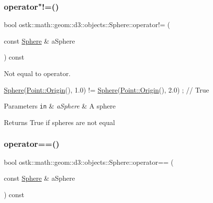 \subsubsection{\texorpdfstring{operator"!=()}{operator!=()}}
{\footnotesize\ttfamily bool ostk\+::math\+::geom\+::d3\+::objects\+::\+Sphere\+::operator!= (\begin{DoxyParamCaption}\item[{const \hyperlink{classostk_1_1math_1_1geom_1_1d3_1_1objects_1_1_sphere}{Sphere} \&}]{a\+Sphere }\end{DoxyParamCaption}) const}



Not equal to operator. 


\begin{DoxyCode}
\hyperlink{classostk_1_1math_1_1geom_1_1d3_1_1objects_1_1_sphere_a6920f72260a7b2c9ffc29283540e16c2}{Sphere}(\hyperlink{classostk_1_1math_1_1geom_1_1d3_1_1objects_1_1_point_a079c199f08b015d456d02728a71b534c}{Point::Origin}(), 1.0) != \hyperlink{classostk_1_1math_1_1geom_1_1d3_1_1objects_1_1_sphere_a6920f72260a7b2c9ffc29283540e16c2}{Sphere}(\hyperlink{classostk_1_1math_1_1geom_1_1d3_1_1objects_1_1_point_a079c199f08b015d456d02728a71b534c}{Point::Origin}(), 2.0) ; \textcolor{comment}{//
       True}
\end{DoxyCode}



\begin{DoxyParams}[1]{Parameters}
\mbox{\tt in}  & {\em a\+Sphere} & A sphere \\
\hline
\end{DoxyParams}
\begin{DoxyReturn}{Returns}
True if spheres are not equal 
\end{DoxyReturn}
\mbox{\label{classostk_1_1math_1_1geom_1_1d3_1_1objects_1_1_sphere_a1bb642dd7e97756a44ca972e6337a43f}} 
\subsubsection{\texorpdfstring{operator==()}{operator==()}}
{\footnotesize\ttfamily bool ostk\+::math\+::geom\+::d3\+::objects\+::\+Sphere\+::operator== (\begin{DoxyParamCaption}\item[{const \hyperlink{classostk_1_1math_1_1geom_1_1d3_1_1objects_1_1_sphere}{Sphere} \&}]{a\+Sphere }\end{DoxyParamCaption}) const}



